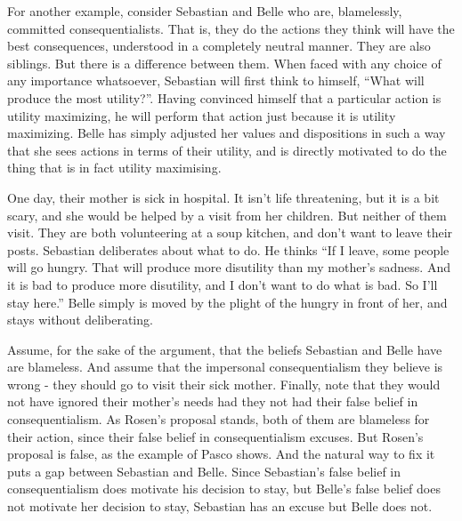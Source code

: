 \documentclass[
  10pt,
  letterpaper,
  twoside]{scrbook}
\begin{document}
For another example, consider {Sebastian} and {Belle} who are,
blamelessly, committed consequentialists. That is, they do the actions
they think will have the best consequences, understood in a completely
neutral manner. They are also siblings. But there is a difference
between them. When faced with any choice of any importance whatsoever,
{Sebastian} will first think to himself, ``What will produce the most
utility?''. Having convinced himself that a particular action is utility
maximizing, he will perform that action just because it is utility
maximizing. {Belle} has simply adjusted her values and dispositions in
such a way that she sees actions in terms of their utility, and is
directly motivated to do the thing that is in fact utility maximising.

One day, their mother is sick in hospital. It isn't life threatening,
but it is a bit scary, and she would be helped by a visit from her
children. But neither of them visit. They are both volunteering at a
soup kitchen, and don't want to leave their posts. {Sebastian}
deliberates about what to do. He thinks ``If I leave, some people will
go hungry. That will produce more disutility than my mother's sadness.
And it is bad to produce more disutility, and I don't want to do what is
bad. So I'll stay here.'' {Belle} simply is moved by the plight of the
hungry in front of her, and stays without deliberating.

Assume, for the sake of the argument, that the beliefs {Sebastian} and
{Belle} have are blameless. And assume that the impersonal
consequentialism they believe is wrong - they should go to visit their
sick mother. Finally, note that they would not have ignored their
mother's needs had they not had their false belief in consequentialism.
As Rosen's proposal stands, both of them are blameless for their action,
since their false belief in consequentialism excuses. But Rosen's
proposal is false, as the example of {Pasco} shows. And the natural way
to fix it puts a gap between {Sebastian} and {Belle}. Since
{Sebastian}'s false belief in consequentialism does motivate his
decision to stay, but {Belle}'s false belief does not motivate her
decision to stay, {Sebastian} has an excuse but {Belle} does not.
\end{document}
